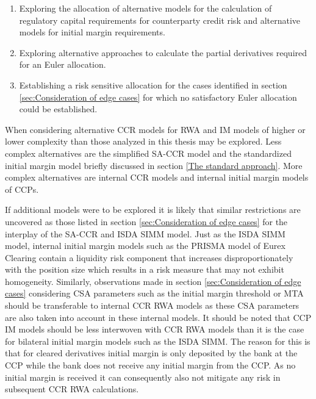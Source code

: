 \documentclass[../Thesis_AHoecherl.tex]{subfiles}
\begin{document}
\begin{enumerate}
    \item Exploring the allocation of alternative models for the calculation of regulatory capital requirements for counterparty credit risk and alternative models for initial margin requirements.
    \item Exploring alternative approaches to calculate the partial derivatives required for an Euler allocation.
    \item Establishing a risk sensitive allocation for the cases  identified in section \ref{sec:Consideration of edge cases} for which no satisfactory Euler allocation could be established.
\end{enumerate}

When considering alternative \gls{CCR} models for \gls{RWA} and \gls{IM} models of higher or lower complexity than those analyzed in this thesis may be explored. 
Less complex alternatives are the simplified \gls{SA-CCR} model \cite[Article 281 and following]{CRRII} and the standardized initial margin model briefly discussed in section \ref{The standard approach}. 
More complex alternatives are internal \gls{CCR} models \cite[CRE 53]{CRE} and internal initial margin models of \glspl{CCP}.

If additional models were to be explored it is likely that similar restrictions are uncovered as those listed in section \ref{sec:Consideration of edge cases} for the interplay of the \gls{SA-CCR} and \gls{ISDA SIMM} model.
Just as the \gls{ISDA SIMM} model, internal initial margin models such as the PRISMA model of Eurex Clearing contain a liquidity risk component that increases disproportionately with the position size \cite[Section 3.5]{EurexDec2012} which results in a risk measure that may not exhibit homogeneity.
Similarly, observations made in section \ref{sec:Consideration of edge cases} considering \gls{CSA} parameters such as the initial margin threshold or \gls{MTA} should be transferable to internal \gls{CCR} \gls{RWA} models as these \gls{CSA} parameters are also taken into account in these internal models.
It should be noted that \gls{CCP} \gls{IM} models should be less interwoven with \gls{CCR} \gls{RWA} models than it is the case for bilateral initial margin models such as the \gls{ISDA SIMM}. 
The reason for this is that for cleared derivatives initial margin is only deposited by the bank at the \gls{CCP} while the bank does not receive any initial margin from the \gls{CCP}.
As no initial margin is received it can consequently also not mitigate any risk in subsequent \gls{CCR} \gls{RWA} calculations.
\end{document}
